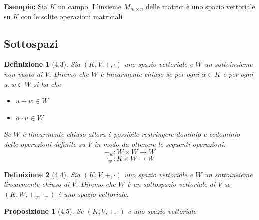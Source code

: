 \documentclass[11pt,a4paper]{article}
\theoremstyle{manuale}
\newtheorem*{definizione}{Definizione}
\newtheorem*{proposizione}{Proposizione}
\theoremstyle{manualecorsivo}
\begin{document}
	\textbf{Esempio:} Sia $K$ un campo. L'insieme $M_{m \times n}$ delle matrici è uno spazio vettoriale su $K$ con le solite operazioni matriciali
	
	\subsection{Sottospazi}
	\begin{definizione}[4.3]
		Sia $(K,V,+, \cdot)$ uno spazio vettoriale e $W$ un sottoinsieme non vuoto di $V$. Diremo che $W$ è linearmente chiuso se per ogni $\alpha \in K$ e per ogni $u,w \in W$ si ha che
		\begin{itemize}
			\item $u+w \in W$
			\item $\alpha \cdot u \in W$
		\end{itemize}
		Se $W$ è linearmente chiuso allora è possibile restringere dominio e codominio delle operazioni definite su $V$ in modo da ottenere le seguenti operazioni:
		$$+_w : W \times W \rightarrow W$$
		$$\cdot_w : K \times W \rightarrow W$$
	\end{definizione}
	
	\begin{definizione}[4.4]
		Sia $(K,V,+,\cdot)$ uno spazio vettoriale e $W$ un sottoinsieme linearmente chiuso di $V$. Diremo che $W$ è un sottospazio vettoriale di $V$ se $(K, W, +_w, \cdot_w)$ è uno spazio vettoriale.
	\end{definizione}
	
	\begin{proposizione}[4.5]
		Se $(K,V,+, \cdot)$ è  uno spazio vettoriale
	\end{proposizione}
	
	
\end{document}
